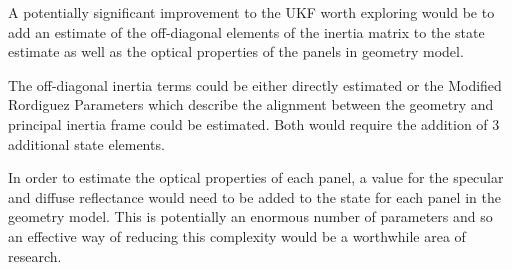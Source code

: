 A potentially significant improvement to the UKF worth exploring would be to add an estimate of the off-diagonal elements of the inertia matrix to the state estimate as well as the optical properties of the panels in geometry model.

The off-diagonal inertia terms could be either directly estimated or the Modified Rordiguez Parameters which describe the alignment between the geometry and principal inertia frame could be estimated. Both would require the addition of 3 additional state elements.

In order to estimate the optical properties of each panel, a value for the specular and diffuse reflectance would need to be added to the state for each panel in the geometry model. This is potentially an enormous number of parameters and so an effective way of reducing this complexity would be a worthwhile area of research.